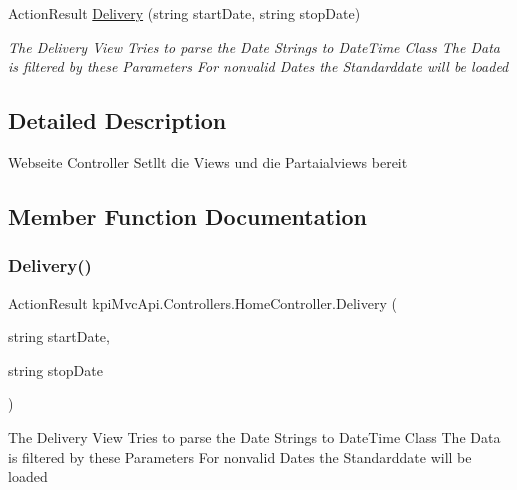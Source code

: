 \begin{DoxyCompactItemize}
Action\+Result \hyperlink{classkpi_mvc_api_1_1_controllers_1_1_home_controller_a0fe5ac7be69616c8f56e8938e042cc27}{Delivery} (string start\+Date, string stop\+Date)
\begin{DoxyCompactList}\small\item\em The Delivery View Tries to parse the Date Strings to Date\+Time Class The Data is filtered by these Parameters For nonvalid Dates the Standarddate will be loaded \end{DoxyCompactList}\end{DoxyCompactItemize}


\subsection{Detailed Description}
Webseite Controller Setllt die Views und die Partaialviews bereit 



\subsection{Member Function Documentation}
\mbox{\label{classkpi_mvc_api_1_1_controllers_1_1_home_controller_a0fe5ac7be69616c8f56e8938e042cc27}} 
\subsubsection{\texorpdfstring{Delivery()}{Delivery()}\hspace{0.1cm}{\footnotesize\ttfamily [1/2]}}
{\footnotesize\ttfamily Action\+Result kpi\+Mvc\+Api.\+Controllers.\+Home\+Controller.\+Delivery (\begin{DoxyParamCaption}\item[{string}]{start\+Date,  }\item[{string}]{stop\+Date }\end{DoxyParamCaption})\hspace{0.3cm}{\ttfamily [inline]}}



The Delivery View Tries to parse the Date Strings to Date\+Time Class The Data is filtered by these Parameters For nonvalid Dates the Standarddate will be loaded 


